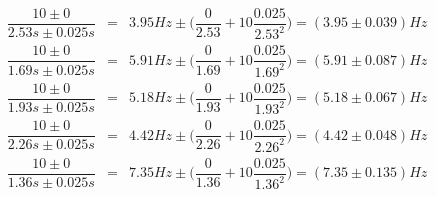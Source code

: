 \documentclass[12pt,a4paper]{article}
\begin{document}
\[
	\begin{array}{rcl}
		\dfrac{10 \pm 0}{2.53s \pm 0.025s} & = & 3.95Hz \pm \Bigg(\dfrac{0}{2.53} + 10 \dfrac{0.025}{2.53^2}\Bigg) = (3.95 \pm 0.039)Hz \\[6mm]
		\dfrac{10 \pm 0}{1.69s \pm 0.025s} & = & 5.91Hz \pm \Bigg(\dfrac{0}{1.69} + 10 \dfrac{0.025}{1.69^2}\Bigg) = (5.91 \pm 0.087)Hz \\[6mm]
		\dfrac{10 \pm 0}{1.93s \pm 0.025s} & = & 5.18Hz \pm \Bigg(\dfrac{0}{1.93} + 10 \dfrac{0.025}{1.93^2}\Bigg) = (5.18 \pm 0.067)Hz \\[6mm]
		\dfrac{10 \pm 0}{2.26s \pm 0.025s} & = & 4.42Hz \pm \Bigg(\dfrac{0}{2.26} + 10 \dfrac{0.025}{2.26^2}\Bigg) = (4.42 \pm 0.048)Hz \\[6mm]
		\dfrac{10 \pm 0}{1.36s \pm 0.025s} & = & 7.35Hz \pm \Bigg(\dfrac{0}{1.36} + 10 \dfrac{0.025}{1.36^2}\Bigg) = (7.35 \pm 0.135)Hz
	\end{array}
\]
\end{document}
